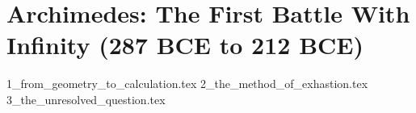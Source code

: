 \section{Archimedes: The First Battle With Infinity (287 BCE to 212 BCE)}  


{1_from_geometry_to_calculation.tex}
{2_the_method_of_exhastion.tex}
{3_the_unresolved_question.tex}
